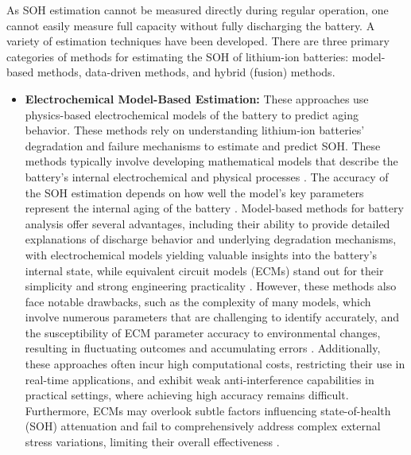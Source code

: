 As SOH estimation cannot be measured directly during regular operation, one cannot easily measure full capacity without fully discharging the battery. A variety of estimation techniques have been developed. There are three primary categories of methods for estimating the SOH of lithium-ion batteries: model-based methods, data-driven methods, and hybrid (fusion) methods\cite{wevj-12-00113}.
\begin{itemize}
    \item \textbf{Electrochemical Model-Based Estimation:} These approaches use physics-based electrochemical models of the battery to predict aging behavior. These methods rely on understanding lithium-ion batteries' degradation and failure mechanisms to estimate and predict SOH. These methods typically involve developing mathematical models that describe the battery's internal electrochemical and physical processes \cite{electronics-13-01675}\cite{s41598-025-92262-8}. The accuracy of the SOH estimation depends on how well the model's key parameters represent the internal aging of the battery \cite{wevj-12-00113}. Model-based methods for battery analysis offer several advantages, including their ability to provide detailed explanations of discharge behavior and underlying degradation mechanisms, with electrochemical models yielding valuable insights into the battery's internal state, while equivalent circuit models (ECMs) stand out for their simplicity and strong engineering practicality \cite{electronics-13-01675}\cite{wevj-12-00113}. However, these methods also face notable drawbacks, such as the complexity of many models, which involve numerous parameters that are challenging to identify accurately, and the susceptibility of ECM parameter accuracy to environmental changes, resulting in fluctuating outcomes and accumulating errors \cite{electronics-13-01675}\cite{wevj-12-00113}. Additionally, these approaches often incur high computational costs, restricting their use in real-time applications, and exhibit weak anti-interference capabilities in practical settings, where achieving high accuracy remains difficult. Furthermore, ECMs may overlook subtle factors influencing state-of-health (SOH) attenuation and fail to comprehensively address complex external stress variations, limiting their overall effectiveness \cite{electronics-13-01675}\cite{wevj-12-00113}.

\end{itemize}
